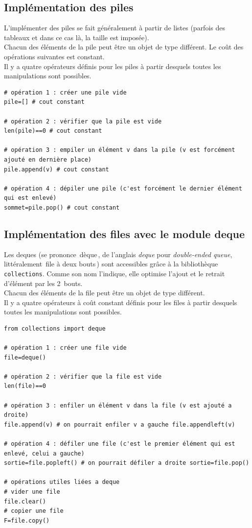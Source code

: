 \subsection{Implémentation des piles}

L'implémenter des piles se fait généralement à partir de listes (parfois des tableaux et dans ce cas là, la taille est imposée).\\
Chacun des éléments de la pile peut être un objet de type différent. Le coût des opérations suivantes est constant.\\
Il y a quatre opérateurs définis pour les piles à partir desquels toutes les manipulations sont possibles.

\begin{lstlisting}
# opération 1 : créer une pile vide
pile=[] # cout constant

# opération 2 : vérifier que la pile est vide
len(pile)==0 # cout constant

# opération 3 : empiler un élément v dans la pile (v est forcément ajouté en dernière place)
pile.append(v) # cout constant

# opération 4 : dépiler une pile (c'est forcément le dernier élément qui est enlevé)
sommet=pile.pop() # cout constant
\end{lstlisting}


\subsection{Implémentation des files avec le module deque}

Les deques (se prononce \og\,dèque\,\fg{}, de l'anglais \emph{deque} pour \emph{double-ended queue}, littéralement \og\,file à deux bouts\,\fg{}) sont accessibles grâce à la bibliothèque \texttt{collections}. Comme son nom l'indique, elle optimise l'ajout et le retrait d'élément par les 2~bouts.\\
Chacun des éléments de la file peut être un objet de type différent.\\
Il y a quatre opérateurs à coût constant définis pour les files à partir desquels toutes les manipulations sont possibles.

\begin{lstlisting}
from collections import deque

# opération 1 : créer une file vide
file=deque()

# opération 2 : vérifier que la file est vide
len(file)==0

# opération 3 : enfiler un élément v dans la file (v est ajouté a droite)
file.append(v) # on pourrait enfiler v a gauche file.appendleft(v)

# opération 4 : défiler une file (c'est le premier élément qui est enlevé, celui a gauche)
sortie=file.popleft() # on pourrait défiler a droite sortie=file.pop()

# opérations utiles liées a deque
# vider une file
file.clear()
# copier une file
F=file.copy()
\end{lstlisting}

